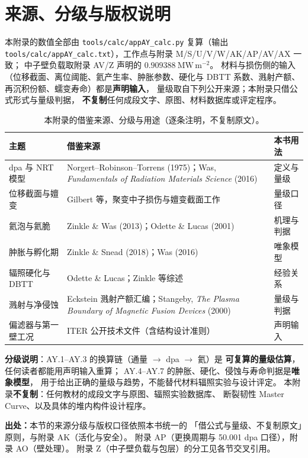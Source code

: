 \section{来源、分级与版权说明}
\label{sec:app-ay-source}

\begingroup\small
本附录的数值全部由 \texttt{tools/\allowbreak{}calc/\allowbreak{}appAY\_calc.py} 复算（输出
\texttt{tools/\allowbreak{}calc/\allowbreak{}appAY\_calc.txt}），工作点与附录 M/S/U/V/W/AK/AP/AV/AX 一致；
中子壁负载取附录 AV/Z 声明的 $0.909388\ \mathrm{MW\,m^{-2}}$。
材料与损伤侧的输入（位移截面、离位阈能、氦产生率、肿胀参数、硬化与
DBTT 系数、溅射产额、再沉积份额、蠕变寿命）都是\textbf{声明输入}，
量级取自下列公开来源；本附录只借公式形式与量级判据，
\textbf{不复制}任何成段文字、原图、材料数据库或评定程序。

\begin{table}[htbp]
\centering
\small
\setlength{\tabcolsep}{4pt}
\caption{本附录的借鉴来源、分级与用途（逐条注明，不复制原文）。}
\label{tab:app-ay-source}
\begin{tabular}{p{5.4cm}p{4.6cm}p{3.4cm}}
\toprule
主题 & 借鉴来源 & 本书用法 \\
\midrule
dpa 与 NRT 模型 & Norgert--Robinson--Torrens (1975)；Was, \emph{Fundamentals of Radiation Materials Science} (2016) & 定义与量级 \\
位移截面与嬗变 & Gilbert 等，聚变中子损伤与嬗变截面工作 & 量级口径 \\
氦泡与氦脆 & Zinkle \& Was (2013)；Odette \& Lucas (2001) & 机理与判据 \\
肿胀与孵化期 & Zinkle \& Snead (2018)；Was (2016) & 唯象模型 \\
辐照硬化与 DBTT & Odette \& Lucas；Zinkle 等综述 & 经验关系 \\
溅射与净侵蚀 & Eckstein 溅射产额汇编；Stangeby, \emph{The Plasma Boundary of Magnetic Fusion Devices} (2000) & 量级与判据 \\
偏滤器与第一壁工况 & ITER 公开技术文件（含结构设计准则） & 声明输入 \\
\bottomrule
\end{tabular}

\end{table}

\textbf{分级说明}：AY.1--AY.3 的换算链（通量 $\to$ dpa $\to$ 氦）是
\textbf{可复算的量级估算}，任何读者都能用声明输入重算；
AY.4--AY.7 的肿胀、硬化、侵蚀与寿命判据是\textbf{唯象模型}，
用于给出正确的量级与趋势，不能替代材料辐照实验与设计评定。
本附录\textbf{不复制}：任何教材的成段文字与原图、辐照实验数据库、
断裂韧性 Master Curve、以及具体的堆内构件设计程序。

\textbf{出处：}本节的来源分级与版权口径依照本书统一的
「借公式与量级、不复制原文」原则，与附录 AK（活化与安全）。
附录 AP（更换周期与 50.001 dpa 口径），附录 AO（壁处理）。
附录 Z（中子壁负载与包层）的分工见各节交叉引用。
\endgroup